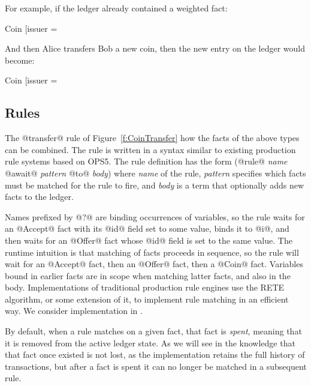 \eject
For example, if the ledger already contained a weighted fact:
\begin{small}
\begin{code}
 Coin [issuer = %
\end{code}
\end{small}

And then Alice transfers Bob a new coin, then the new entry on the ledger would become:
\begin{small}
\begin{code}
 Coin [issuer = %
\end{code}
\end{small}


\subsection{Rules}
The @transfer@ rule of Figure~\ref{f:CoinTransfer} how the facts of the above types can be combined. The rule is written in a syntax similar to existing production rule systems based on OPS5. The rule definition has the form (@rule@ \emph{name} @await@ \emph{pattern} @to@ \emph{body}) where \emph{name} of the rule, \emph{pattern} specifies which facts must be matched for the rule to fire, and \emph{body} is a term that optionally adds new facts to the ledger.


Names prefixed by @?@ are binding occurrences of variables, so the rule waits for an @Accept@ fact with its @id@ field set to some value, binds it to @i@, and then waits for an @Offer@ fact whose @id@ field is set to the same value. The runtime intuition is that matching of facts proceeds in sequence, so the rule will wait for an @Accept@ fact, then an @Offer@ fact, then a @Coin@ fact. Variables bound in earlier facts are in scope when matching latter facts, and also in the body. Implementations of traditional production rule engines use the RETE~\cite{Forgy1981:RETE} algorithm, or some extension of it, to implement rule matching in an efficient way. We consider implementation in \REF.

By default, when a rule matches on a given fact, that fact is \emph{spent}, meaning that it is removed from the active ledger state. As we will see in \REF the knowledge that that fact once existed is not lost, as the implementation retains the full history of transactions, but after a fact is spent it can no longer be matched in a subsequent rule.


